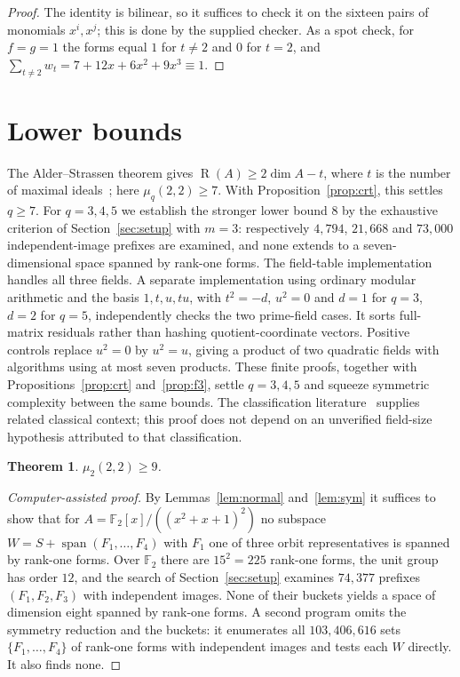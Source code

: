 \documentclass[11pt]{amsart}
\newtheorem{theorem}{Theorem}[section]
\theoremstyle{definition}
\theoremstyle{remark}
\newcommand{\F}{\mathbb F}
\newcommand{\R}{\operatorname{R}}
\newcommand{\spn}{\operatorname{span}}
\begin{document}
\begin{proof}
The identity is bilinear, so it suffices to check it on the sixteen pairs of monomials $x^i,x^j$; this is done by the supplied checker. As a spot check, for $f=g=1$ the forms equal $1$ for $t\ne2$ and $0$ for $t=2$, and $\sum_{t\ne2}w_t=7+12x+6x^2+9x^3\equiv1$.
\end{proof}

\section{Lower bounds}\label{sec:lower}

The Alder--Strassen theorem gives $\R(A)\ge2\dim A-t$, where $t$ is the number of maximal ideals~\cite{AlderStrassen1981}; here $\mu_q(2,2)\ge7$. With Proposition~\ref{prop:crt}, this settles $q\ge7$. For $q=3,4,5$ we establish the stronger lower bound $8$ by the exhaustive criterion of Section~\ref{sec:setup} with $m=3$: respectively $4{,}794$, $21{,}668$ and $73{,}000$ independent-image prefixes are examined, and none extends to a seven-dimensional space spanned by rank-one forms. The field-table implementation handles all three fields. A separate implementation using ordinary modular arithmetic and the basis $1,t,u,tu$, with $t^2=-d$, $u^2=0$ and $d=1$ for $q=3$, $d=2$ for $q=5$, independently checks the two prime-field cases. It sorts full-matrix residuals rather than hashing quotient-coordinate vectors. Positive controls replace $u^2=0$ by $u^2=u$, giving a product of two quadratic fields with algorithms using at most seven products. These finite proofs, together with Propositions~\ref{prop:crt} and~\ref{prop:f3}, settle $q=3,4,5$ and squeeze symmetric complexity between the same bounds. The classification literature~\cite{Winograd1977,AGW1988,Blaser2005} supplies related classical context; this proof does not depend on an unverified field-size hypothesis attributed to that classification.

\begin{theorem}\label{thm:q2}
$\mu_2(2,2)\ge9$.
\end{theorem}

\begin{proof}[Computer-assisted proof]
By Lemmas~\ref{lem:normal} and~\ref{lem:sym} it suffices to show that for $A=\F_2[x]/((x^2+x+1)^2)$ no subspace $W=S+\spn(F_1,\dots,F_4)$ with $F_1$ one of three orbit representatives is spanned by rank-one forms. Over $\F_2$ there are $15^2=225$ rank-one forms, the unit group has order $12$, and the search of Section~\ref{sec:setup} examines $74{,}377$ prefixes $(F_1,F_2,F_3)$ with independent images. None of their buckets yields a space of dimension eight spanned by rank-one forms. A second program omits the symmetry reduction and the buckets: it enumerates all $103{,}406{,}616$ sets $\{F_1,\dots,F_4\}$ of rank-one forms with independent images and tests each $W$ directly. It also finds none.
\end{proof}
\end{document}
